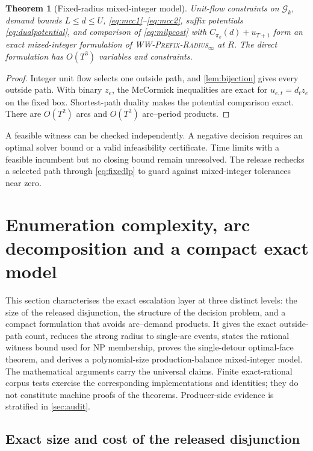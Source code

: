 \documentclass[11pt]{article}
\newtheorem{theorem}{Theorem}[section]
\theoremstyle{definition}
\newcommand{\cG}{\mathcal{G}}
\newcommand{\WWR}{\textsc{WW-Prefix-Radius}\ensuremath{_{\infty}}}
\begin{document}
\begin{theorem}[Fixed-radius mixed-integer model]\label{thm:milp}
Unit-flow constraints on $\cG_k$, demand bounds $L\le d\le U$, \eqref{eq:mcc1}--\eqref{eq:mcc2}, suffix potentials \eqref{eq:dualpotential}, and comparison of \eqref{eq:milpcost} with $C_{\pi_k}(d)+u_{T+1}$ form an exact mixed-integer formulation of \WWR{} at $R$. The direct formulation has $O(T^3)$ variables and constraints.
\end{theorem}

\begin{proof}
Integer unit flow selects one outside path, and \cref{lem:bijection} gives every outside path. With binary $z_e$, the McCormick inequalities are exact for $u_{e,t}=d_tz_e$ on the fixed box. Shortest-path duality makes the potential comparison exact. There are $O(T^2)$ arcs and $O(T^3)$ arc--period products.
\end{proof}

A feasible witness can be checked independently. A negative decision requires an optimal solver bound or a valid infeasibility certificate. Time limits with a feasible incumbent but no closing bound remain unresolved. The release rechecks a selected path through \eqref{eq:fixedlp} to guard against mixed-integer tolerances near zero.

\section{Enumeration complexity, arc decomposition and a compact exact model}\label{sec:addendum}

This section characterises the exact escalation layer at three distinct
levels: the size of the released disjunction, the structure of the decision
problem, and a compact formulation that avoids arc--demand products. It gives
the exact outside-path count, reduces the strong radius to single-arc events,
states the rational witness bound used for NP membership, proves the
single-detour optimal-face theorem, and derives a polynomial-size
production-balance mixed-integer model. The mathematical arguments carry the
universal claims. Finite exact-rational corpus tests exercise the corresponding
implementations and identities; they do not constitute machine proofs of the
theorems. Producer-side evidence is stratified in \cref{sec:audit}.

\subsection{Exact size and cost of the released disjunction}\label{sec:enumsize}
\end{document}
